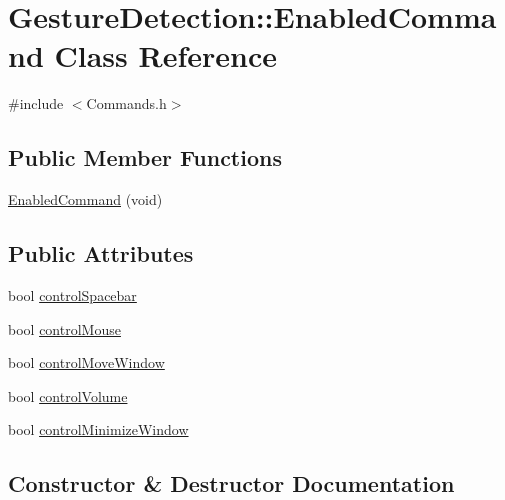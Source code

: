 \hypertarget{classGestureDetection_1_1EnabledCommand}{}\section{Gesture\+Detection\+:\+:Enabled\+Command Class Reference}
\label{classGestureDetection_1_1EnabledCommand}


{\ttfamily \#include $<$Commands.\+h$>$}

\subsection*{Public Member Functions}
\begin{DoxyCompactItemize}
\item 
\hyperlink{classGestureDetection_1_1EnabledCommand_a595a6548b56d5a128d27751589f9e2e4}{Enabled\+Command} (void)
\end{DoxyCompactItemize}
\subsection*{Public Attributes}
\begin{DoxyCompactItemize}
\item 
bool \hyperlink{classGestureDetection_1_1EnabledCommand_abf2d47343a7abbcd43baa577861dd4b7}{control\+Spacebar}
\item 
bool \hyperlink{classGestureDetection_1_1EnabledCommand_a49930173fcb2bab93322e9c60d31cad5}{control\+Mouse}
\item 
bool \hyperlink{classGestureDetection_1_1EnabledCommand_a5f91d83cc097a360d4c39a30563eaa18}{control\+Move\+Window}
\item 
bool \hyperlink{classGestureDetection_1_1EnabledCommand_a8d2542571d224cdca24f428bc066215f}{control\+Volume}
\item 
bool \hyperlink{classGestureDetection_1_1EnabledCommand_a0901b0b7dbda1712065df28848ff4c0d}{control\+Minimize\+Window}
\end{DoxyCompactItemize}


\subsection{Constructor \& Destructor Documentation}
\mbox{\label{classGestureDetection_1_1EnabledCommand_a595a6548b56d5a128d27751589f9e2e4}} 
